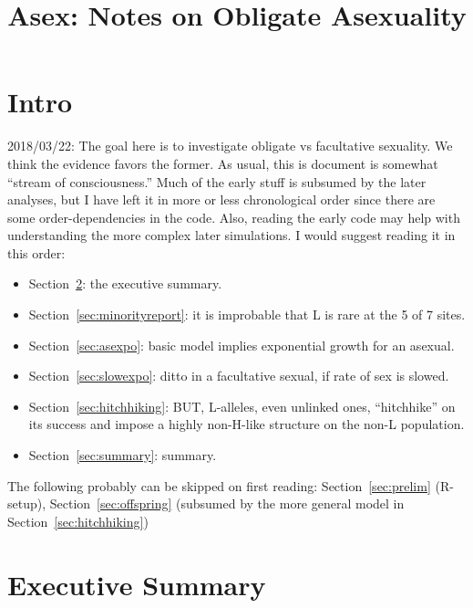 \documentclass{article}\usepackage[]{graphicx}\usepackage[]{color}
\begin{document}
\title{Asex: Notes on Obligate Asexuality}
\maketitle

\tableofcontents

\section{Intro}
2018/03/22: The goal here is to investigate obligate vs facultative sexuality.  We think the
evidence favors the former.  As usual, this is document is somewhat ``stream of consciousness.''
Much of the early stuff is subsumed by the later analyses, but I have left it in more or less
chronological order since there are some order-dependencies in the code.  Also, reading the early
code may help with understanding the more complex later simulations.  I would suggest reading it in
this order:
\begin{itemize}
  \item Section~\ref{sec:exec}: the executive summary.
  \item Section~\ref{sec:minorityreport}: it is improbable that L is rare at the 5 of 7 sites. 
  \item Section~\ref{sec:asexpo}: basic model implies exponential growth for an asexual.
  \item Section~\ref{sec:slowexpo}: ditto in a facultative sexual, if rate of sex is slowed.
  \item Section~\ref{sec:hitchhiking}: BUT, L-alleles, even unlinked ones, ``hitchhike'' on its
    success and impose a highly non-H-like structure on the non-L population.
  \item Section~\ref{sec:summary}: summary.
\end{itemize}
The following probably can be skipped on first reading: Section~\ref{sec:prelim} (R-setup),
Section~\ref{sec:offspring} (subsumed by the more general model in Section~\ref{sec:hitchhiking})


\section{Executive Summary}
\label{sec:exec}
\end{document}
